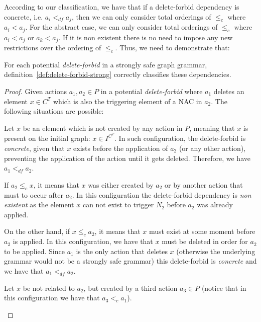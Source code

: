 According to our classification, we have that if a delete-forbid dependency is concrete, i.e. $a_i <_{df} a_j$, then we can only consider total orderings of $\leq_c$ where $a_i < a_j$. For the abstract case, we can only consider total orderings of $\leq_c$ where $a_i < a_j$ or $a_k < a_j$. If it is non existent there is no need to impose any new restrictions over the ordering of $\leq_c$. Thus, we need to demonstrate that:

\begin{thm} For each potential \emph{delete-forbid} in a strongly safe graph grammar, definition~\ref{def:delete-forbid-strong} correctly classifies these dependencies.
\end{thm}

\begin{proof} Given actions $a_1,a_2 \in P$ in a potential \emph{delete-forbid} where $a_1$ deletes an element $x \in C^T$ which is also the triggering element of a NAC in $a_2$. The following situations are possible:
\hfill
\begin{description}[style=nextline,leftmargin=*]

  \item [Triggering element is present on the initial graph:]
Let $x$ be an element which is not created by any action in $P$, meaning that $x$ is present on the initial graph: $x \in I^{C^T}$. In such configuration, the delete-forbid is \emph{concrete}, given that $x$ exists before the application of $a_2$ (or any other action), preventing the application of the action until it gets deleted. Therefore, we have $a_1 <_{df} a_2$.

  \item [Triggering element is related to the action:] If $a_2 \leq_c x$, it means that $x$ was either created by $a_2$ or by another action that must to occur after $a_2$. In this configuration the delete-forbid dependency is \emph{non existent} as the element $x$ can not exist to trigger $N_2$ before $a_2$ was already applied.

    On the other hand, if $x \leq_c a_2$, it means that $x$ must exist at some moment before $a_2$ is applied. In this configuration, we have that $x$ must be deleted in order for $a_2$ to be applied. Since $a_1$ is the only action that deletes $x$ (otherwise the underlying grammar would not be a strongly safe grammar) this delete-forbid is \emph{concrete} and we have that $a_1 <_{df} a_2$.

\item [Triggering element is not related to the action:]
  Let $x$ be not related to $a_2$, but created by a third action $a_3 \in P$ (notice that in this configuration we have that $a_3 <_{c} a_1$).


\end{description}
\end{proof}
